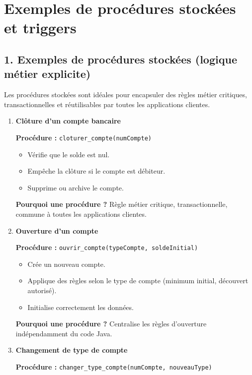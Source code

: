 \documentclass[11pt]{article}
\begin{document}
\section*{Exemples de procédures stockées et triggers}

\subsection*{1. Exemples de procédures stockées (logique métier explicite)}

Les procédures stockées sont idéales pour encapsuler des règles métier critiques, transactionnelles et réutilisables par toutes les applications clientes.

\begin{enumerate}

\item \textbf{Clôture d'un compte bancaire}

\textbf{Procédure :} \texttt{cloturer\_compte(numCompte)}

\begin{itemize}
    \item Vérifie que le solde est nul.
    \item Empêche la clôture si le compte est débiteur.
    \item Supprime ou archive le compte.
\end{itemize}

\textbf{Pourquoi une procédure ?}
Règle métier critique, transactionnelle, commune à toutes les applications clientes.

\item \textbf{Ouverture d'un compte}

\textbf{Procédure :} \texttt{ouvrir\_compte(typeCompte, soldeInitial)}

\begin{itemize}
    \item Crée un nouveau compte.
    \item Applique des règles selon le type de compte (minimum initial, découvert autorisé).
    \item Initialise correctement les données.
\end{itemize}

\textbf{Pourquoi une procédure ?}
Centralise les règles d’ouverture indépendamment du code Java.

\item \textbf{Changement de type de compte}

\textbf{Procédure :} \texttt{changer\_type\_compte(numCompte, nouveauType)}


\end{enumerate}
\end{document}
